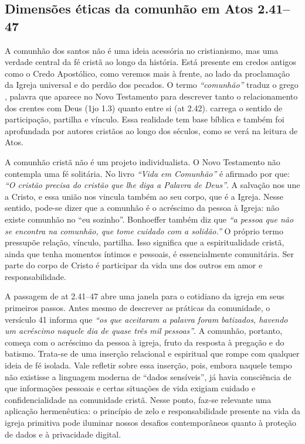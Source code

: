\subsection{Dimensões éticas da comunhão em Atos 2.41–47}

A comunhão dos santos não é uma ideia acessória no cristianismo, mas uma verdade central da fé cristã ao longo da história. Está presente em credos antigos como o Credo Apostólico, como veremos mais à frente, ao lado da proclamação da Igreja universal e do perdão dos pecados. O termo \textit{``comunhão''} traduz o grego \textit{}, palavra que aparece no Novo Testamento para descrever tanto o relacionamento dos crentes com Deus (\gls{1jo} 1.3) quanto entre si (\gls{at} 2.42). \textit{} carrega o sentido de participação, partilha e vínculo. Essa realidade tem base bíblica e também foi aprofundada por autores cristãos ao longo dos séculos, como se verá na leitura de Atos.

A comunhão cristã não é um projeto individualista. O Novo Testamento não contempla uma fé solitária. No livro \textit{``Vida em Comunhão''} é afirmado por  que: \textit{``O cristão precisa do cristão que lhe diga a Palavra de Deus''}. A salvação nos une a Cristo, e essa união nos vincula também ao seu corpo, que é a Igreja. Nesse sentido, pode-se dizer que a comunhão é o acréscimo da pessoa à Igreja: não existe comunhão no ``eu sozinho''. Bonhoeffer também diz que \textit{``a pessoa que não se encontra na comunhão, que tome cuidado com a solidão.''} \cite[p.~59]{bonhoeffer1997} O próprio termo \textit{} pressupõe relação, vínculo, partilha. Isso significa que a espiritualidade cristã, ainda que tenha momentos íntimos e pessoais, é essencialmente comunitária. Ser parte do corpo de Cristo é participar da vida uns dos outros em amor e responsabilidade.

A passagem de \gls{at} 2.41–47 abre uma janela para o cotidiano da igreja em seus primeiros passos. Antes mesmo de descrever as práticas da comunidade, o versículo 41 informa que \textit{``os que aceitaram a palavra foram batizados, havendo um acréscimo naquele dia de quase três mil pessoas''}. A comunhão, portanto, começa com o acréscimo da pessoa à igreja, fruto da resposta à pregação e do batismo. Trata-se de uma inserção relacional e espiritual que rompe com qualquer ideia de fé isolada. Vale refletir sobre essa inserção, pois, embora naquele tempo não existisse a linguagem moderna de ``dados sensíveis'', já havia consciência de que informações pessoais e certas situações de vida exigiam cuidado e confidencialidade na comunidade cristã. Nesse ponto, faz-se relevante uma aplicação hermenêutica: o princípio de zelo e responsabilidade presente na vida da igreja primitiva pode iluminar nossos desafios contemporâneos quanto à proteção de dados e à privacidade digital.

